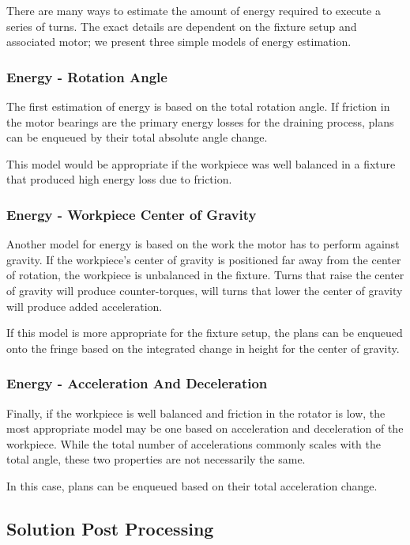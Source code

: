 There are many ways to estimate the amount of energy required to execute a series of turns. The exact details are dependent on the fixture setup and associated motor; we present three simple models of energy estimation.

		\subsubsection{Energy - Rotation Angle}

The first estimation of energy is based on the total rotation angle. If friction in the motor bearings are the primary energy losses for the draining process, plans can be enqueued by their total absolute angle change.

This model would be appropriate if the workpiece was well balanced in a fixture that produced high energy loss due to friction.

		\subsubsection{Energy - Workpiece Center of Gravity}

Another model for energy is based on the work the motor has to perform against gravity. If the workpiece's center of gravity is positioned far away from the center of rotation, the workpiece is unbalanced in the fixture. Turns that raise the center of gravity will produce counter-torques, will turns that lower the center of gravity will produce added acceleration.

If this model is more appropriate for the fixture setup, the plans can be enqueued onto the fringe based on the integrated change in height for the center of gravity.

		\subsubsection{Energy - Acceleration And Deceleration}

Finally, if the workpiece is well balanced and friction in the rotator is low, the most appropriate model may be one based on acceleration and deceleration of the workpiece. While the total number of accelerations commonly scales with the total angle, these two properties are not necessarily the same.

In this case, plans can be enqueued based on their total acceleration change.

	\subsection{Solution Post Processing}

